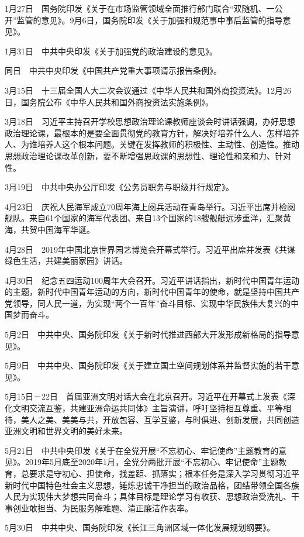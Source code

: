 \documentclass[10pt,a4paper,twocolumn]{book}
\begin{document}
1月27日　国务院印发《关于在市场监管领域全面推行部门联合“双随机、一公开”监管的意见》。9月6日，国务院印发《关于加强和规范事中事后监管的指导意见》。

1月31日　中共中央印发《关于加强党的政治建设的意见》。

同日　中共中央印发《中国共产党重大事项请示报告条例》。

3月15日　十三届全国人大二次会议通过《中华人民共和国外商投资法》。12月26日，国务院公布《中华人民共和国外商投资法实施条例》。

3月18日　习近平主持召开学校思想政治理论课教师座谈会时讲话强调，办好思想政治理论课，最根本的是要全面贯彻党的教育方针，解决好培养什么人、怎样培养人、为谁培养人这个根本问题。关键在发挥教师的积极性、主动性、创造性。推动思想政治理论课改革创新，要不断增强思政课的思想性、理论性和亲和力、针对性。

3月19日　中共中央办公厅印发《公务员职务与职级并行规定》。

4月23日　庆祝人民海军成立70周年海上阅兵活动在青岛举行。习近平出席并检阅舰队。来自61个国家的海军代表团、来自13个国家的18艘舰艇远涉重洋，汇聚黄海，共贺中国海军华诞。

4月28日　2019年中国北京世界园艺博览会开幕式举行。习近平出席并发表《共谋绿色生活，共建美丽家园》讲话。

4月30日　纪念五四运动100周年大会召开。习近平讲话指出，新时代中国青年运动的主题，新时代中国青年运动的方向，新时代中国青年的使命，就是坚持中国共产党领导，同人民一道，为实现“两个一百年”奋斗目标、实现中华民族伟大复兴的中国梦而奋斗。

5月2日　中共中央、国务院印发《关于新时代推进西部大开发形成新格局的指导意见》。

5月9日　中共中央、国务院印发《关于建立国土空间规划体系并监督实施的若干意见》。

5月15日－22日　首届亚洲文明对话大会在北京召开。习近平在开幕式上发表《深化文明交流互鉴，共建亚洲命运共同体》主旨演讲，呼吁坚持相互尊重、平等相待，美人之美、美美与共，开放包容、互学互鉴，与时俱进、创新发展，共同创造亚洲文明和世界文明的美好未来。

5月21日　中共中央印发《关于在全党开展“不忘初心、牢记使命”主题教育的意见》。2019年5月底至2020年1月，全党分两批开展“不忘初心、牢记使命”主题教育，总要求是守初心、担使命，找差距、抓落实；根本任务是深入学习贯彻习近平新时代中国特色社会主义思想，锤炼忠诚干净担当的政治品格，团结带领全国各族人民为实现伟大梦想共同奋斗；具体目标是理论学习有收获、思想政治受洗礼、干事创业敢担当、为民服务解难题、清正廉洁作表率。

5月30日　中共中央、国务院印发《长江三角洲区域一体化发展规划纲要》。
\end{document}
